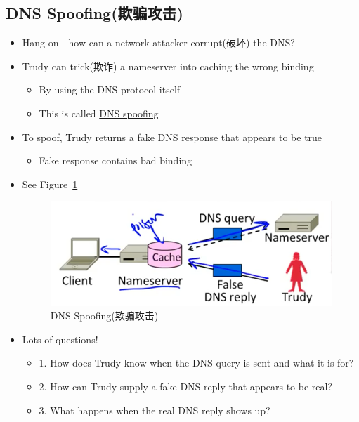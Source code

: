 \documentclass[12pt]{ctexart}   %
\begin{document}
	\subsection{DNS Spoofing(欺骗攻击)}
	\begin{itemize}
		\item Hang on - how can a network attacker corrupt(破坏) the DNS?
		\item Trudy can trick(欺诈) a nameserver into caching the wrong binding
		\begin{itemize}
			\item By using the DNS protocol itself
			\item This is called \underline{DNS spoofing}
		\end{itemize}

		\item To spoof, Trudy returns a fake DNS response that appears to be true 
		\begin{itemize}
			\item Fake response contains bad binding
		\end{itemize}
		\item See Figure~\ref{fig:10-6-3}
		  
		\begin{figure}[h!] %
		\centering
		\includegraphics[scale=0.7]{images/10-6-3}
		\caption{DNS Spoofing(欺骗攻击)}
		\label{fig:10-6-3}
		\end{figure}

		\item Lots of questions!
		\begin{itemize}
			\item {\color{blue} 1.} How does Trudy know when the DNS query is sent and what it is for?
			\item {\color{blue} 2.} How can Trudy supply a fake DNS reply that appears to be real?
			\item {\color{blue} 3.} What happens when the real DNS reply shows up?
		\end{itemize}


\end{itemize}
\end{document}
